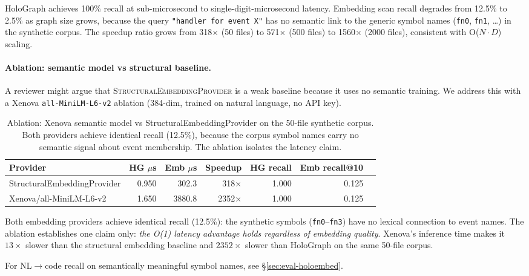 HoloGraph achieves 100\% recall at sub-microsecond to single-digit-microsecond
latency.  Embedding scan recall degrades from 12.5\% to 2.5\% as graph size
grows, because the query \texttt{"handler for event X"} has no semantic link
to the generic symbol names (\texttt{fn0}, \texttt{fn1}, \ldots) in the synthetic
corpus.  The speedup ratio grows from 318$\times$ (50 files) to 571$\times$
(500 files) to 1560$\times$ (2000 files), consistent with O($N \cdot D$)
scaling.

\paragraph{Ablation: semantic model vs structural baseline.}
\label{sec:ablation-xenova}

A reviewer might argue that \textsc{StructuralEmbeddingProvider} is a weak
baseline because it uses no semantic training.  We address this with a Xenova
\texttt{all-MiniLM-L6-v2} ablation (384-dim, trained on natural language,
no API key).

\begin{table}[h]
\centering
\caption{Ablation: Xenova semantic model vs StructuralEmbeddingProvider on the
  50-file synthetic corpus.  Both providers achieve identical recall (12.5\%),
  because the corpus symbol names carry no semantic signal about event
  membership.  The ablation isolates the latency claim.}
\label{tab:ablation-xenova}
\begin{tabular}{lrrrrrr}
\toprule
Provider & HG $\mu$s & Emb $\mu$s & Speedup & HG recall & Emb recall@10 \\
\midrule
StructuralEmbeddingProvider &  0.950 &   302.3 &   318$\times$ & 1.000 & 0.125 \\
Xenova/all-MiniLM-L6-v2    &  1.650 &  3880.8 &  2352$\times$ & 1.000 & 0.125 \\
\bottomrule
\end{tabular}
\end{table}

Both embedding providers achieve identical recall (12.5\%): the synthetic symbols
(\texttt{fn0}--\texttt{fn3}) have no lexical connection to event names.
The ablation establishes one claim only: \emph{the O(1) latency advantage holds
regardless of embedding quality}.  Xenova's inference time makes it $13\times$
slower than the structural embedding baseline and $2352\times$ slower than
HoloGraph on the same 50-file corpus.

For NL$\to$code recall on semantically meaningful symbol names, see
\S\ref{sec:eval-holoembed}.

